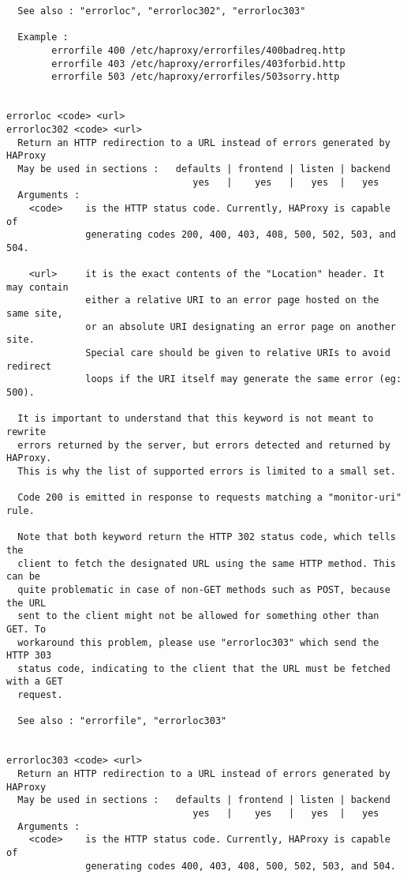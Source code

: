 \begin{verbatim}
  See also : "errorloc", "errorloc302", "errorloc303"

  Example :
        errorfile 400 /etc/haproxy/errorfiles/400badreq.http
        errorfile 403 /etc/haproxy/errorfiles/403forbid.http
        errorfile 503 /etc/haproxy/errorfiles/503sorry.http


errorloc <code> <url>
errorloc302 <code> <url>
  Return an HTTP redirection to a URL instead of errors generated by HAProxy
  May be used in sections :   defaults | frontend | listen | backend
                                 yes   |    yes   |   yes  |   yes
  Arguments :
    <code>    is the HTTP status code. Currently, HAProxy is capable of
              generating codes 200, 400, 403, 408, 500, 502, 503, and 504.

    <url>     it is the exact contents of the "Location" header. It may contain
              either a relative URI to an error page hosted on the same site,
              or an absolute URI designating an error page on another site.
              Special care should be given to relative URIs to avoid redirect
              loops if the URI itself may generate the same error (eg: 500).

  It is important to understand that this keyword is not meant to rewrite
  errors returned by the server, but errors detected and returned by HAProxy.
  This is why the list of supported errors is limited to a small set.

  Code 200 is emitted in response to requests matching a "monitor-uri" rule.

  Note that both keyword return the HTTP 302 status code, which tells the
  client to fetch the designated URL using the same HTTP method. This can be
  quite problematic in case of non-GET methods such as POST, because the URL
  sent to the client might not be allowed for something other than GET. To
  workaround this problem, please use "errorloc303" which send the HTTP 303
  status code, indicating to the client that the URL must be fetched with a GET
  request.

  See also : "errorfile", "errorloc303"


errorloc303 <code> <url>
  Return an HTTP redirection to a URL instead of errors generated by HAProxy
  May be used in sections :   defaults | frontend | listen | backend
                                 yes   |    yes   |   yes  |   yes
  Arguments :
    <code>    is the HTTP status code. Currently, HAProxy is capable of
              generating codes 400, 403, 408, 500, 502, 503, and 504.


\end{verbatim}

